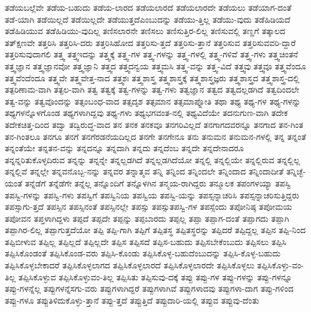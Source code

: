 {ತಡೆಯಬಲ್ಲೆವೇ
ತಡೆಯ-ಬಹುದು
ತಡೆಯ-ಲಾರದ
ತಡೆಯಲಾರದೆ
ತಡೆಯಲಾರದೇ
ತಡೆಯಲು
ತಡೆಯಾಗ-ದಂತೆ
ತಡೆ-ಯಾಗಿ
ತಡೆಯಿಲ್ಲದೆ
ತಡೆಯಿಲ್ಲದೇ
ತಡೆಯುತ್ತದೆಎಂಬುದನ್ನು
ತಡೆಯು-ತ್ತಿಲ್ಲ
ತಡೆಯು-ವುದು
ತಡೆಹಿಡಿಯದೆ
ತಡೆಹಿಡಿಯುವ
ತಡೆಹಿಡಿಯು-ವುದಿಲ್ಲ
ತಣಿಸಲಾರನೇ
ತಣಿಸಲು
ತಣಿಸುತ್ತಿರ-ಲಿಲ್ಲ
ತಣಿಸುವಲ್ಲಿ
ತಣ್ಣಗೆ
ತತ್ಕಾಲದ
ತತ್ಕ್ಷಣವೇ
ತತ್ತರಿಸಿ
ತತ್ತರಿಸಿ-ದರು
ತತ್ತರಿಸಿಹೋದ
ತತ್ತರಿಸು-ತ್ತದೆ
ತತ್ತರಿಸು-ತ್ತಾನೆ
ತತ್ತರಿಸುವ
ತತ್ತರಿಸುವವರಿ-ದ್ದಾರೆ
ತತ್ತರಿಸುವುದಾಗಲಿ
ತತ್ತ್ವ
ತತ್ತ್ವಇದನ್ನು
ತತ್ತ್ವಕ್ಕೆ
ತತ್ತ್ವ-ಗಳ
ತತ್ತ್ವ-ಗಳನ್ನು
ತತ್ತ್ವ-ಗಳಲ್ಲಿ
ತತ್ತ್ವ-ಗಳಿವೆ
ತತ್ತ್ವ-ಗಳು
ತತ್ತ್ವಚಿಂತನೆ
ತತ್ತ್ವಜ್ಞಾನ
ತತ್ತ್ವಜ್ಞಾನವೋ
ತತ್ತ್ವಜ್ಞಾನಿ
ತತ್ತ್ವದ
ತತ್ತ್ವದನ್ವಯ
ತತ್ತ್ವಮಸಿ
ತತ್ತ್ವ-ವನ್ನು
ತತ್ತ್ವ-ವಿದೆ
ತತ್ತ್ವವು
ತತ್ತ್ವವೂ
ತತ್ತ್ವವೆಂದೂ
ತತ್ತ್ವವೆಂದೆಂದೂ
ತತ್ತ್ವವೇ
ತತ್ತ್ವವೇತ್ತ-ನಾದ
ತತ್ತ್ವಶಃ
ತತ್ತ್ವಶಾಸ್ತ್ರ
ತತ್ತ್ವಶಾಸ್ತ್ರಕ್ಕೆ
ತತ್ತ್ವಶಾಸ್ತ್ರಜ್ಞರು
ತತ್ತ್ವಶಾಸ್ತ್ರದ
ತತ್ತ್ವಶಾಸ್ತ್ರ-ದಲ್ಲಿ
ತತ್ಪರಿಣಾಮ-ವಾಗಿ
ತತ್ಫಲ-ವಾಗಿ
ತತ್ವ
ತತ್ವಕ್ಕೆ
ತತ್ವ-ಗಳನ್ನು
ತತ್ವ-ಗಳು
ತತ್ವಜ್ಞಾನ
ತತ್ವದ
ತತ್ವದಲ್ಲಡಗಿದೆ
ತತ್ವದಿಂದಲೇ
ತತ್ವ-ವನ್ನು
ತತ್ವವೊಂದನ್ನು
ತತ್ಸಂಬಂಧ-ವಾದ
ತತ್ಸದೃಶ
ತತ್ಸಮಾನ
ತತ್ಸಮಾಪ್ನೋತಿ
ತಥಾ
ತಥ್ಯ
ತಥ್ಯ-ಗಳ
ತಥ್ಯ-ಗಳನ್ನು
ತಥ್ಯಗಳನ್ನೊಳಗೊಂಡ
ತಥ್ಯಗಳಾಗಿದ್ದವು
ತಥ್ಯ-ಗಳು
ತಥ್ಯಭಗವಂತ-ನಲ್ಲಿ
ತಥ್ಯವಿದೆಯೇ
ತದನುಗುಣ-ವಾಗಿ
ತದೇಕ
ತದೇಕಚಿತ್ತ-ದಿಂದ
ತದ್ವಾ
ತದ್ವಿರುದ್ಧ-ವಾದ
ತನ
ತನಕ
ತನಕವೂ
ತನಗರಿವಿಲ್ಲದೆ
ತನಗಾಗದವರನ್ನೂ
ತನಗಾದ
ತನ-ಗಿಂತ
ತನ-ಗಿಂತಲೂ
ತನಗೂ
ತನಗೆ
ತನಗೆರಡನೆಯದಿಲ್ಲದ
ತನಗೇ
ತನಗೇನೂ
ತನು
ತನುಮನ
ತನುಮನ-ಗಳಲ್ಲಿ
ತನ್ನ
ತನ್ನಂತೆ
ತನ್ನಂತೆಯೇ
ತನ್ನತನ-ವನ್ನು
ತನ್ನದನ್ನೂ
ತನ್ನದಾಗಿ
ತನ್ನದು
ತನ್ನದೆಂಬ
ತನ್ನದೇ
ತನ್ನದೇನಾದರೂ
ತನ್ನನ್ನರಿತುಕೊಳ್ಳದಿರುವ
ತನ್ನನ್ನು
ತನ್ನನ್ನೇ
ತನ್ನಲ್ಲಡಗಿದೆ
ತನ್ನಲ್ಲಡಗಿದೆಯೋ
ತನ್ನಲ್ಲಿ
ತನ್ನಲ್ಲಿಯೇ
ತನ್ನಲ್ಲಿರುವ
ತನ್ನಲ್ಲಿಲ್ಲ
ತನ್ನಲ್ಲಿವೆ
ತನ್ನಲ್ಲೇ
ತನ್ನವನೊಬ್ಬ-ನನ್ನು
ತನ್ನವರ
ತನ್ನಾತ್ಮವ
ತನ್ನಿ
ತನ್ನಿಂದ
ತನ್ನಿಂದಲೇ
ತನ್ನಿಂದಾದ
ತನ್ನಿಂದಾದೀತೆ
ತನ್ನಿಚ್ಛೆ-ಯಂತೆ
ತನ್ನೆಡೆಗೆ
ತನ್ನೆಡೆಗೇ
ತನ್ನೆಲ್ಲ
ತನ್ನೊಂದಿಗೆ
ತನ್ನೊಳಗಿನ
ತನ್ಮಯ-ರಾಗಿದ್ದರು
ತನ್ಮೂಲಕ
ತಪಂಗಳಯ್ಯಾ
ತಪಸ್ವಿ
ತಪಸ್ವಿ-ಗಳನ್ನು
ತಪಸ್ವಿ-ಗಳು
ತಪಸ್ವಿಗೆ
ತಪಸ್ವಿನಿಯ
ತಪಸ್ವಿಯ
ತಪಸ್ವಿ-ಯನ್ನು
ತಪಸ್ಸನ್ನಾಚರಿಸಿ
ತಪಸ್ಸನ್ನಾಚರಿಸುತ್ತಿದ್ದರು
ತಪಸ್ಸಾಗು-ತ್ತದೆ
ತಪಸ್ಸಿನ
ತಪಸ್ಸಿನಂತೆ
ತಪಸ್ಸಿನಲ್ಲೇ
ತಪಸ್ಸು
ತಪಸ್ಸುತಪಸ್ವಿ-ಗಳ
ತಪಸ್ಸೆಂದು
ತಪೋನಿಷ್ಠ
ತಪೋಮಯ
ತಪೋವನ
ತಪ್ತಳಾಗಿದ್ದಳು
ತಪ್ಪದೆ
ತಪ್ಪದೇ
ತಪ್ಪನ್ನು
ತಪ್ಪಬಾರದು
ತಪ್ಪಲ್ಲ
ತಪ್ಪಾ
ತಪ್ಪಾಗ-ದಂತೆ
ತಪ್ಪಾಗದು
ತಪ್ಪಾಗಿ
ತಪ್ಪಾಗಿರ-ಲಿಲ್ಲ
ತಪ್ಪಾಗುತ್ತದೆಯೋ
ತಪ್ಪಿ
ತಪ್ಪಿ-ಗಾಗಿ
ತಪ್ಪಿಗೆ
ತಪ್ಪಿತಸ್ಥ
ತಪ್ಪಿತಸ್ಥರನ್ನು
ತಪ್ಪಿದರೆ
ತಪ್ಪಿದ್ದಲ್ಲ
ತಪ್ಪಿನ
ತಪ್ಪಿ-ನಿಂದ
ತಪ್ಪಿಬೀಳುವ
ತಪ್ಪಿಲ್ಲ
ತಪ್ಪಿಲ್ಲದೆ
ತಪ್ಪಿಲ್ಲದೇ
ತಪ್ಪಿಸ
ತಪ್ಪಿಸದೆ
ತಪ್ಪಿಸ-ಬಹುದು
ತಪ್ಪಿಸಬೇಕೆಂಬುದು
ತಪ್ಪಿಸಲು
ತಪ್ಪಿಸಿ
ತಪ್ಪಿಸಿಕೊಂಡಂತೆ
ತಪ್ಪಿಸಿಕೊಂಡ-ವರು
ತಪ್ಪಿಸಿ-ಕೊಂಡು
ತಪ್ಪಿಸಿಕೊಳ್ಳ-ಬಹುದೆಂಬುದನ್ನು
ತಪ್ಪಿಸಿ-ಕೊಳ್ಳ-ಬಹುದು
ತಪ್ಪಿಸಿಕೊಳ್ಳಬೇಕಾದರೆ
ತಪ್ಪಿಸಿಕೊಳ್ಳಲಾಗದ
ತಪ್ಪಿಸಿಕೊಳ್ಳಲಾರದೆ
ತಪ್ಪಿಸಿಕೊಳ್ಳಲಾರದೇ
ತಪ್ಪಿಸಿಕೊಳ್ಳಲು
ತಪ್ಪಿಸಿಕೊಳ್ಳು-ವಂ-ತಿಲ್ಲ
ತಪ್ಪಿಸಿಕೊಳ್ಳುವ
ತಪ್ಪಿಸಿಕೊಳ್ಳುವಂ-ತಿಲ್ಲ
ತಪ್ಪಿಸಿತು
ತಪ್ಪಿಸುವು-ದಕ್ಕೆ
ತಪ್ಪು
ತಪ್ಪು-ಗಳ
ತಪ್ಪು-ಗಳನ್ನು
ತಪ್ಪು-ಗಳನ್ನೂ
ತಪ್ಪು-ಗಳನ್ನೆಲ್ಲ
ತಪ್ಪುಗಳನ್ನೆಸಗು-ವರು
ತಪ್ಪುಗಳಾಗಿದ್ದರೆ
ತಪ್ಪುಗಳಾಗಿವೆ
ತಪ್ಪುಗಳಾದವು
ತಪ್ಪುಗಳಾ-ದಾಗ
ತಪ್ಪು-ಗಳಿಂದ
ತಪ್ಪು-ಗಳೂ
ತಪ್ಪುತಿಳಿದುಕೊಳ್ಳು-ತ್ತಾನೆ
ತಪ್ಪು-ತ್ತದೆ
ತಪ್ಪುತ್ತಿದೆ
ತಪ್ಪುದಾರಿ-ಯಲ್ಲಿ
ತಪ್ಪುವ
ತಪ್ಪುವು-ದೆಂತು
}
